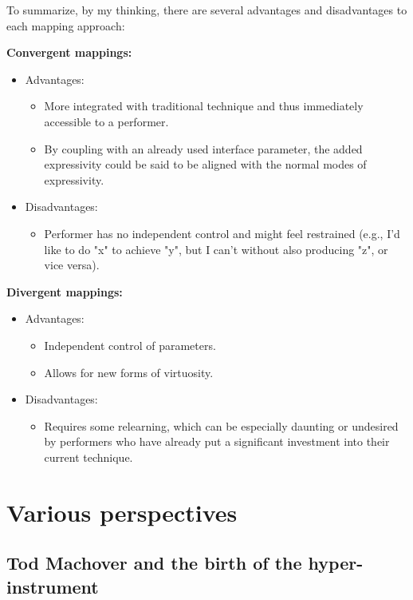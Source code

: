 \documentclass[12pt,twoside,maitrise]{dms_ks}
\theoremstyle{definition}
\begin{document}
{To summarize, by my thinking, there are several advantages and disadvantages to each mapping approach:

\textbf{Convergent mappings:}

\begin{itemize}
  \item Advantages:
  \begin{itemize}
    \item More integrated with traditional technique and thus immediately accessible to a performer.
    \item By coupling with an already used interface parameter, the added expressivity could be said to be aligned with the normal modes of expressivity.
  \end{itemize}
  \item Disadvantages:
  \begin{itemize}
    \item Performer has no independent control and might feel restrained (e.g., I'd like to do "x" to achieve "y", but I can't without also producing "z", or vice versa).
  \end{itemize}
\end{itemize}

\textbf{Divergent mappings:}

\begin{itemize}
  \item Advantages:
  \begin{itemize}
    \item Independent control of parameters.
    \item Allows for new forms of virtuosity.
  \end{itemize}
  \item Disadvantages:
  \begin{itemize}
    \item Requires some relearning, which can be especially daunting or undesired by performers who have already put a significant investment into their current technique.
  \end{itemize}
\end{itemize}

\section{Various perspectives}

\subsection{Tod Machover and the birth of the hyper-instrument}

}
\end{document}
